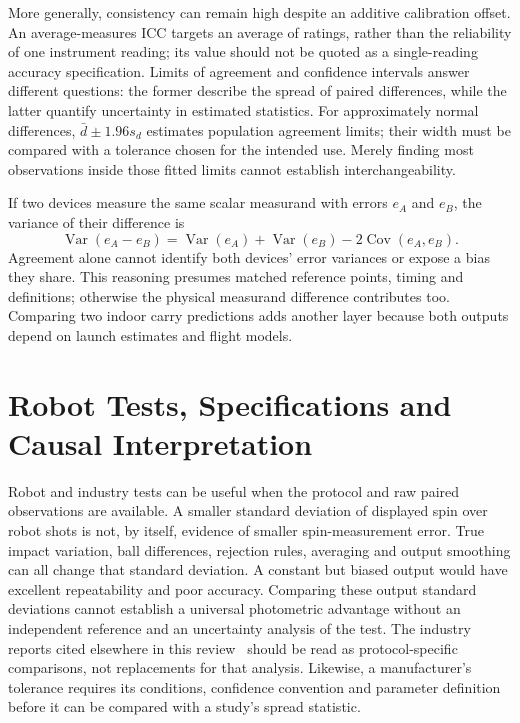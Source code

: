 More generally, consistency can remain high despite an additive calibration offset.
An average-measures ICC targets an average of ratings, rather than the reliability of one instrument reading; its value should not be quoted as a single-reading accuracy specification.
Limits of agreement and confidence intervals answer different questions: the former describe the spread of paired differences, while the latter quantify uncertainty in estimated statistics.
For approximately normal differences, $\bar d\pm1.96s_d$ estimates population agreement limits; their width must be compared with a tolerance chosen for the intended use.
Merely finding most observations inside those fitted limits cannot establish interchangeability.

If two devices measure the same scalar measurand with errors $e_A$ and $e_B$, the variance of their difference is
\begin{equation}
\label{eq:paireddevicevariance}
\operatorname{Var}(e_A-e_B)
=\operatorname{Var}(e_A)+\operatorname{Var}(e_B)
 -2\operatorname{Cov}(e_A,e_B).
\end{equation}
Agreement alone cannot identify both devices' error variances or expose a bias they share.
This reasoning presumes matched reference points, timing and definitions; otherwise the physical measurand difference contributes too.
Comparing two indoor carry predictions adds another layer because both outputs depend on launch estimates and flight models.

\section{Robot Tests, Specifications and Causal Interpretation}

Robot and industry tests can be useful when the protocol and raw paired observations are available.
A smaller standard deviation of displayed spin over robot shots is not, by itself, evidence of smaller spin-measurement error.
True impact variation, ball differences, rejection rules, averaging and output smoothing can all change that standard deviation.
A constant but biased output would have excellent repeatability and poor accuracy.
Comparing these output standard deviations cannot establish a universal photometric advantage without an independent reference and an uncertainty analysis of the test.
The industry reports cited elsewhere in this review~\cite{golflabsrobot,mygolfspyindoor} should be read as protocol-specific comparisons, not replacements for that analysis.
Likewise, a manufacturer's tolerance requires its conditions, confidence convention and parameter definition before it can be compared with a study's spread statistic.

